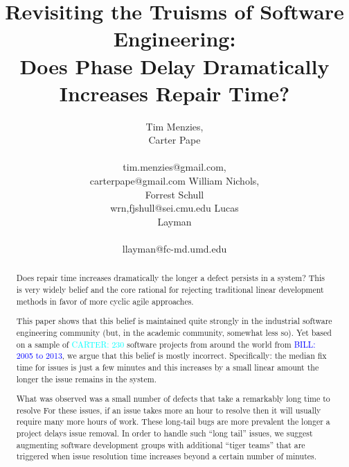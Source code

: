 \documentclass{sig-alternate}
\newcommand{\bill}[1]{\textcolor{blue}{BILL: #1}}
\newcommand{\carter}[1]{\textcolor{cyan}{CARTER: #1}}
\begin{document}
\title{Revisiting the Truisms of Software Engineering:\\ Does Phase Delay Dramatically Increases  Repair Time?}
\author{
\alignauthor
Tim Menzies, \\Carter Pape\\
       \\
       tim.menzies@gmail.com,\\carterpape@gmail.com
\alignauthor
William Nichols,\\ Forrest Schull\\
wrn,fjshull@sei.cmu.edu
\alignauthor
Lucas \\Layman\\
       \\ 
       llayman@fc-md.umd.edu
} 


 
\maketitle
\begin{abstract}
Does
repair time increases dramatically
the longer a defect persists in a system?
This  is very widely belief and the core rational  for
 rejecting   traditional linear development methods
 in favor of more cyclic agile approaches.

This paper shows that this belief is maintained
quite strongly in the industrial software engineering
community (but, in the academic community, somewhat less so).
Yet based on a sample of 
\carter{230} software projects from around the world from 
\bill{2005 to 2013}, we argue that this belief is mostly 
incorrect. Specifically: the median fix time for issues
is just a few minutes and this increases by a small linear amount
the longer the issue remains in the system. 

What was observed was a small number
of defects that take a remarkably long time to resolve
For these issues, if an issue takes more an hour
to resolve then it will usually require many more hours of work.
These long-tail bugs
are more prevalent the longer a project delays issue removal. 
In order to handle such ``long tail'' issues,
we suggest  augmenting software
development groups with additional ``tiger teams'' that are triggered
when issue resolution time increases beyond a certain number of
minutes.
\end{abstract}
\end{document}
